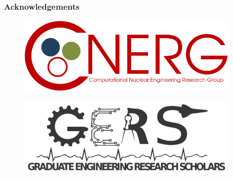\begin{frame}
  \frametitle{Acknowledgements}
    \begin{figure}
      \centering
      \includegraphics[height=0.15\textheight]{./figures/cnerg-logo.png}
    \end{figure}
    \begin{figure}
      \centering
      \includegraphics[height=0.15\textheight]{./figures/gers-logo.png}
    \end{figure}
\end{frame}
